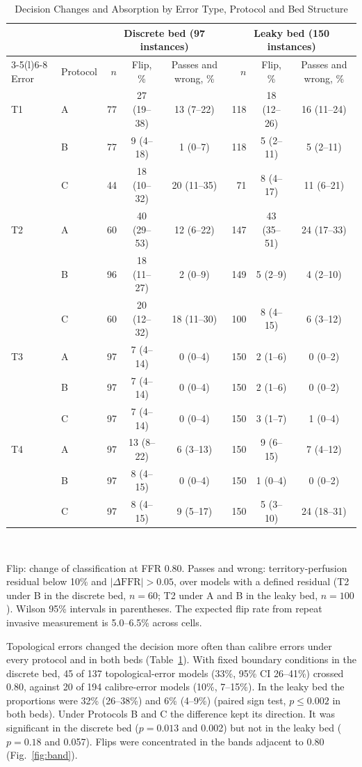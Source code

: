 \documentclass[journal]{IEEEtran}
\begin{document}
\begin{table}[!t]
\caption{Decision Changes and Absorption by Error Type, Protocol and Bed Structure}
\label{tab:results}
\centering\footnotesize
\begin{tabular}{@{}llrccrcc@{}}
\toprule
 & & \multicolumn{3}{c}{Discrete bed (97 instances)} & \multicolumn{3}{c}{Leaky bed (150 instances)}\\
\cmidrule(lr){3-5}\cmidrule(l){6-8}
Error & Protocol & $n$ & Flip, \% & Passes and wrong, \% & $n$ & Flip, \% & Passes and wrong, \%\\
\midrule
T1 & A & 77 & 27 (19--38) & 13 (7--22) & 118 & 18 (12--26) & 16 (11--24) \\
 & B & 77 & 9 (4--18) & 1 (0--7) & 118 & 5 (2--11) & 5 (2--11) \\
 & C & 44 & 18 (10--32) & 20 (11--35) & 71 & 8 (4--17) & 11 (6--21) \\
\addlinespace[2pt]
T2 & A & 60 & 40 (29--53) & 12 (6--22) & 147 & 43 (35--51) & 24 (17--33) \\
 & B & 96 & 18 (11--27) & 2 (0--9) & 149 & 5 (2--9) & 4 (2--10) \\
 & C & 60 & 20 (12--32) & 18 (11--30) & 100 & 8 (4--15) & 6 (3--12) \\
\addlinespace[2pt]
T3 & A & 97 & 7 (4--14) & 0 (0--4) & 150 & 2 (1--6) & 0 (0--2) \\
 & B & 97 & 7 (4--14) & 0 (0--4) & 150 & 2 (1--6) & 0 (0--2) \\
 & C & 97 & 7 (4--14) & 0 (0--4) & 150 & 3 (1--7) & 1 (0--4) \\
\addlinespace[2pt]
T4 & A & 97 & 13 (8--22) & 6 (3--13) & 150 & 9 (6--15) & 7 (4--12) \\
 & B & 97 & 8 (4--15) & 0 (0--4) & 150 & 1 (0--4) & 0 (0--2) \\
 & C & 97 & 8 (4--15) & 9 (5--17) & 150 & 5 (3--10) & 24 (18--31) \\
\bottomrule
\end{tabular}
\\[2pt]
\parbox{\textwidth}{\footnotesize Flip: change of classification at FFR 0.80. Passes and wrong: territory-perfusion
residual below 10\% and $|\Delta\mathrm{FFR}| > 0.05$, over models with a defined residual (T2 under B in the discrete
bed, $n = 60$; T2 under A and B in the leaky bed, $n = 100$). Wilson 95\% intervals in parentheses. The expected flip
rate from repeat invasive measurement is 5.0--6.5\% across cells.}
\end{table}

Topological errors changed the decision more often than calibre errors under every protocol and in both beds
(Table~\ref{tab:results}). With fixed boundary conditions in the discrete bed, 45 of 137 topological-error models
(33\%, 95\% CI 26--41\%) crossed 0.80, against 20 of 194 calibre-error models (10\%, 7--15\%). In the leaky bed the
proportions were 32\% (26--38\%) and 6\% (4--9\%) (paired sign test, $p \leq 0.002$ in both beds). Under
Protocols B and C the difference kept its direction. It was significant in the discrete bed
($p = 0.013$ and 0.002) but not in the leaky bed ($p = 0.18$ and 0.057). Flips were concentrated in the bands
adjacent to 0.80 (Fig.~\ref{fig:band}).
\end{document}
